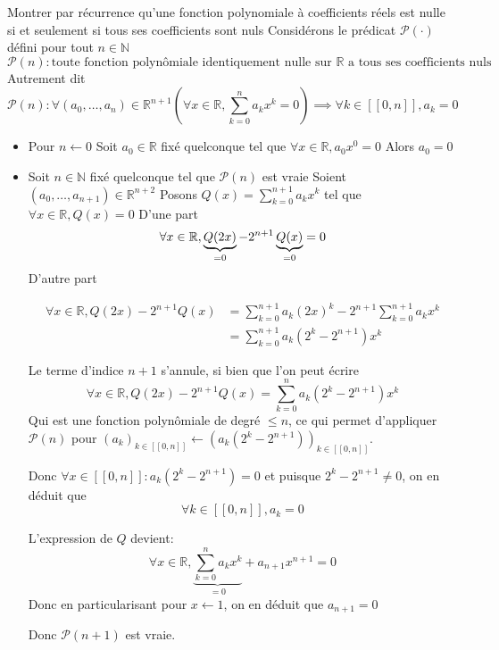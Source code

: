 \documentclass{article}
\renewenvironment{question_kholle}[2][ ]
{
	\subsection{\texorpdfstring{#2}{}}
	\notblank{#1}
	{
		\noindent #1
		\bigbreak
	}
	{}
	\begin{proof}
}
{
	\end{proof}
}
\begin{document}
\begin{question_kholle}{Montrer par récurrence qu'une fonction polynomiale à coefficients réels est nulle si et seulement si tous ses coefficients sont nuls}
    Considérons le prédicat $\mathcal{P}(\cdot)$ défini pour tout $n \in \mathbb{N}$
    $$
    \mathcal{P}(n) : \text{toute fonction polynômiale identiquement nulle sur }\mathbb{R} \text{ a tous ses coefficients nuls}
    $$
    Autrement dit
    $$
    \mathcal{P}(n) : \forall(a_{0}, \dots ,a_{n}) \in \mathbb{R}^{n+1}\left( \forall x \in \mathbb{R}, \sum_{k=0}^{n}a_{k}x^{k} = 0 \right) \implies \forall k \in [ \! [ 0, n ] \!], a_{k} = 0
    $$
    \begin{itemize}[label=$\lozenge$]
        \item Pour $n \leftarrow 0$
        Soit $a_{0} \in \mathbb{R}$ fixé quelconque tel que $\forall x \in \mathbb{R}, a_{0}x^{0} = 0$ Alors $a_{0} = 0$
        
        \item Soit $n \in \mathbb{N}$ fixé quelconque tel que $\mathcal{P}(n)$ est vraie
        Soient $(a_{0},\dots, a_{n+1}) \in \mathbb{R}^{n+2}$
        Posons $Q(x) = \sum_{k=0}^{n+1}a_{k}x^{k}$ tel que $\forall x \in \mathbb{R}, Q(x) = 0$
        D'une part
        $$
        \forall x \in \mathbb R, \underbrace{ Q(2x) }_{ =0 } - 2^{n+1}\underbrace{ Q(x) }_{ =0 } = 0
        $$
        D'autre part
        
        \begin{align*}
            \forall x \in \mathbb{R}, Q(2x) - 2^{n+1}Q(x) &= \sum_{k=0}^{n+1}a_{k}(2x)^{k}-2^{n+1}\sum_{k=0}^{n+1}a_{k}x^{k} \\
            &= \sum_{k=0}^{n+1}a_{k}(2^{k}-2^{n+1})x^{k}
        \end{align*}
        
        Le terme d'indice $n+1$ s'annule, si bien que l'on peut écrire
        $$\forall x \in \mathbb{R}, Q(2x) - 2^{n+1}Q(x) = \sum_{k=0}^{n}a_{k}(2^{k}-2^{n+1})x^{k}$$
        Qui est une fonction polynômiale de degré $\leqslant n$, ce qui permet d'appliquer $\mathcal{P}(n)$ pour $(a_{k})_{k \in[ \! [ 0, n ] \!]} \leftarrow (a_{k}(2^{k}-2^{n+1}))_{k \in[ \! [ 0, n ] \!]}$.
        
        Donc $\forall x \in [ \! [ 0, n ] \!]: a_{k}(2^{k}-2^{n+1}) = 0$ et puisque $2^{k}-2^{n+1} \neq 0$, on en déduit que $$\forall k \in [ \! [ 0, n ] \!], a_{k} = 0$$
        
        L'expression de $Q$ devient:
        $$
        \forall x \in \mathbb{R}, \underbrace{ \sum_{k=0}^{n}a_{k}x^{k} }_{ =0 }+ a_{n+1}x^{n+1} = 0
        $$
        Donc en particularisant pour $x\leftarrow 1$, on en déduit que $a_{n+1} = 0$
        
        Donc $\mathcal{P}(n+1)$ est vraie.
    \end{itemize}
\end{question_kholle}
\end{document}
